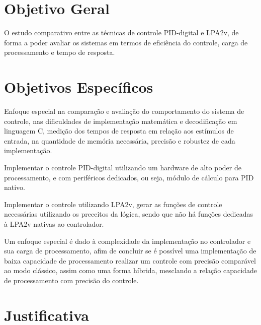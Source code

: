 \section{Objetivo Geral}
O estudo comparativo entre as técnicas de controle PID-digital e LPA2v, de forma a poder avaliar os sistemas em termos de eficiência do controle, carga de processamento e tempo de resposta.



\section{Objetivos Específicos}
Enfoque especial na comparação e avaliação do comportamento do sistema de controle, nas dificuldades de implementação matemática e decodificação em linguagem C, medição dos tempos de resposta em relação aos estímulos de entrada, na quantidade de memória necessária, precisão e robustez de cada implementação.

Implementar o controle PID-digital utilizando um hardware de alto poder de processamento, e com periféricos dedicados, ou seja, módulo de cálculo para PID nativo. 

Implementar o controle utilizando LPA2v, gerar as funções de controle necessárias utilizando os preceitos da lógica, sendo que não há funções dedicadas à LPA2v nativas ao controlador.

Um enfoque especial é dado à complexidade da implementação no controlador e sua carga de processamento, afim de concluir se é possível uma implementação de baixa capacidade de processamento realizar um controle com precisão comparável ao modo clássico, assim como uma forma híbrida, mesclando a relação capacidade de processamento com precisão do controle. 



\section{Justificativa}

